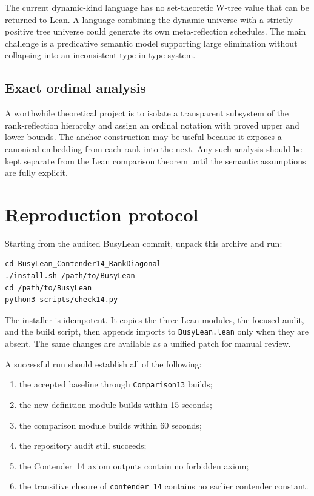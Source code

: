\documentclass[11pt]{article}
\theoremstyle{definition}
\theoremstyle{remark}
\newcommand{\lean}[1]{\texttt{#1}}
\begin{document}
The current dynamic-kind language has no set-theoretic W-tree value that can be
returned to Lean.  A language combining the dynamic universe with a strictly
positive tree universe could generate its own meta-reflection schedules.  The
main challenge is a predicative semantic model supporting large elimination
without collapsing into an inconsistent type-in-type system.

\subsection{Exact ordinal analysis}

A worthwhile theoretical project is to isolate a transparent subsystem of the
rank-reflection hierarchy and assign an ordinal notation with proved upper and
lower bounds.  The anchor construction may be useful because it exposes a
canonical embedding from each rank into the next.  Any such analysis should be
kept separate from the Lean comparison theorem until the semantic assumptions
are fully explicit.

\section{Reproduction protocol}

Starting from the audited BusyLean commit, unpack this archive and run:

\begin{lstlisting}[language={},basicstyle=\ttfamily\small]
cd BusyLean_Contender14_RankDiagonal
./install.sh /path/to/BusyLean
cd /path/to/BusyLean
python3 scripts/check14.py
\end{lstlisting}

The installer is idempotent.  It copies the three Lean modules, the focused
audit, and the build script, then appends imports to \lean{BusyLean.lean} only
when they are absent.  The same changes are available as a unified patch for
manual review.

A successful run should establish all of the following:
\begin{enumerate}[leftmargin=*]
\item the accepted baseline through \lean{Comparison13} builds;
\item the new definition module builds within 15 seconds;
\item the comparison module builds within 60 seconds;
\item the repository audit still succeeds;
\item the Contender~14 axiom outputs contain no forbidden axiom;
\item the transitive closure of \lean{contender\_14} contains no earlier
  contender constant.
\end{enumerate}
\end{document}
